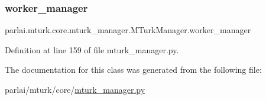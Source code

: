 \subsubsection{\texorpdfstring{worker\+\_\+manager}{worker\_manager}}
{\footnotesize\ttfamily parlai.\+mturk.\+core.\+mturk\+\_\+manager.\+M\+Turk\+Manager.\+worker\+\_\+manager}



Definition at line 159 of file mturk\+\_\+manager.\+py.



The documentation for this class was generated from the following file\+:\begin{DoxyCompactItemize}
\item 
parlai/mturk/core/\hyperlink{mturk__manager_8py}{mturk\+\_\+manager.\+py}\end{DoxyCompactItemize}
